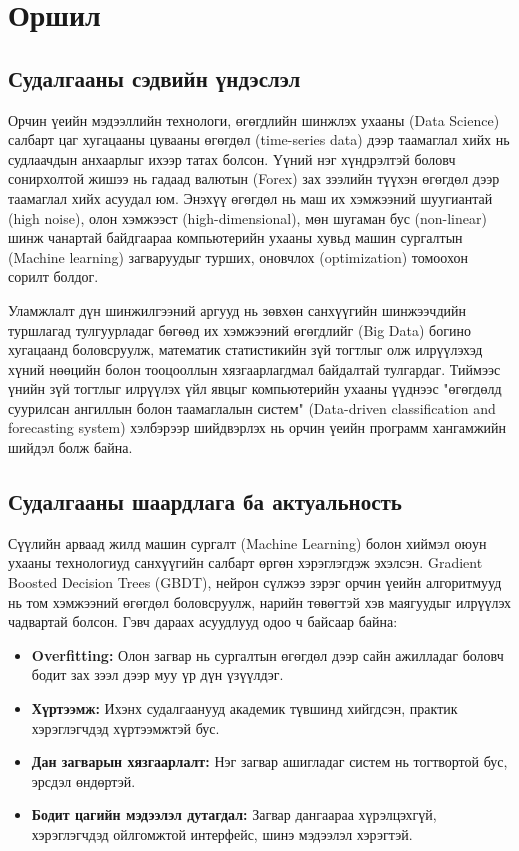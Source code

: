 \chapter*{Оршил}

\section*{Судалгааны сэдвийн үндэслэл}

Орчин үеийн мэдээллийн технологи, өгөгдлийн шинжлэх ухааны (Data Science) салбарт цаг хугацааны цувааны өгөгдөл (time-series data) дээр таамаглал хийх нь судлаачдын анхаарлыг ихээр татах болсон. Үүний нэг хүндрэлтэй боловч сонирхолтой жишээ нь гадаад валютын (Forex) зах зээлийн түүхэн өгөгдөл дээр таамаглал хийх асуудал юм. Энэхүү өгөгдөл нь маш их хэмжээний шуугиантай (high noise), олон хэмжээст (high-dimensional), мөн шугаман бус (non-linear) шинж чанартай байдгаараа компьютерийн ухааны хувьд машин сургалтын (Machine learning) загваруудыг турших, оновчлох (optimization) томоохон сорилт болдог.

Уламжлалт дүн шинжилгээний аргууд нь зөвхөн санхүүгийн шинжээчдийн туршлагад тулгуурладаг бөгөөд их хэмжээний өгөгдлийг (Big Data) богино хугацаанд боловсруулж, математик статистикийн зүй тогтлыг олж илрүүлэхэд хүний нөөцийн болон тооцооллын хязгаарлагдмал байдалтай тулгардаг. Тиймээс үнийн зүй тогтлыг илрүүлэх үйл явцыг компьютерийн ухааны үүднээс "өгөгдөлд суурилсан ангиллын болон таамаглалын систем" (Data-driven classification and forecasting system) хэлбэрээр шийдвэрлэх нь орчин үеийн программ хангамжийн шийдэл болж байна.

\section*{Судалгааны шаардлага ба актуальность}

Сүүлийн арваад жилд машин сургалт (Machine Learning) болон хиймэл оюун ухааны технологиуд санхүүгийн салбарт өргөн хэрэглэгдэж эхэлсэн. Gradient Boosted Decision Trees (GBDT), нейрон сүлжээ зэрэг орчин үеийн алгоритмууд нь том хэмжээний өгөгдөл боловсруулж, нарийн төвөгтэй хэв маягуудыг илрүүлэх чадвартай болсон. Гэвч дараах асуудлууд одоо ч байсаар байна:

\begin{itemize}
    \item \textbf{Overfitting:} Олон загвар нь сургалтын өгөгдөл дээр сайн ажилладаг боловч бодит зах зээл дээр муу үр дүн үзүүлдэг.
    \item \textbf{Хүртээмж:} Ихэнх судалгаанууд академик түвшинд хийгдсэн, практик хэрэглэгчдэд хүртээмжтэй бус.
    \item \textbf{Дан загварын хязгаарлалт:} Нэг загвар ашигладаг систем нь тогтвортой бус, эрсдэл өндөртэй.
    \item \textbf{Бодит цагийн мэдээлэл дутагдал:} Загвар дангаараа хүрэлцэхгүй, хэрэглэгчдэд ойлгомжтой интерфейс, шинэ мэдээлэл хэрэгтэй.
\end{itemize}

